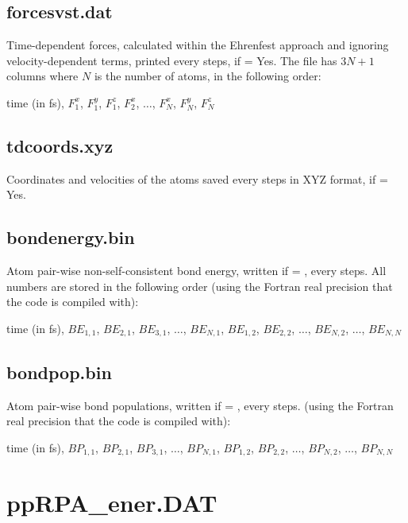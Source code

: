 \subsection{forcesvst.dat}

Time-dependent forces, calculated within the Ehrenfest approach and
ignoring velocity-dependent terms, printed every 
steps, if  = Yes. The file has $3N +1$ columns where $N$ is
the number of atoms, in the following order:

time (in fs), $F_1^x$, $F_1^y$, $F_1^z$, $F_2^x$, $\dots$, $F_N^x$,
$F_N^y$, $F_N^z$

\subsection{tdcoords.xyz}

Coordinates and velocities of the atoms saved every
 steps in XYZ format, if  = Yes.

\subsection{bondenergy.bin}
\label{sec:beformatout}

Atom pair-wise non-self-consistent bond energy, written if 
= , every  steps. All numbers are stored in the
following order (using the Fortran real precision that the code is compiled
with):

time (in fs), $BE_{1,1}$, $BE_{2,1}$, $BE_{3,1}$, $\dots$, $BE_{N,1}$,
$BE_{1,2}$, $BE_{2,2}$, $\dots$, $BE_{N,2}$, $\dots$, $BE_{N,N}$

\subsection{bondpop.bin}
\label{sec:bpformatout}

Atom pair-wise bond populations, written if  = ,
every  steps. (using the Fortran real precision that the code
is compiled with):

time (in fs), $BP_{1,1}$, $BP_{2,1}$, $BP_{3,1}$, $\dots$, $BP_{N,1}$,
$BP_{1,2}$, $BP_{2,2}$, $\dots$, $BP_{N,2}$, $\dots$, $BP_{N,N}$


\section{ppRPA\_ener.DAT}
\label{sec:ppRPAout}

